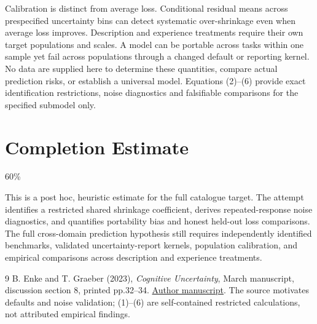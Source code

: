 \documentclass[11pt,a4paper]{article}
\begin{document}
Calibration is distinct from average loss. Conditional residual means across prespecified uncertainty bins can detect systematic over-shrinkage even when average loss improves. Description and experience treatments require their own target populations and scales. A model can be portable across tasks within one sample yet fail across populations through a changed default or reporting kernel. No data are supplied here to determine these quantities, compare actual prediction risks, or establish a universal model. Equations (2)--(6) provide exact identification restrictions, noise diagnostics and falsifiable comparisons for the specified submodel only.

\section{Completion Estimate}
60\%

This is a post hoc, heuristic estimate for the full catalogue target.
The attempt identifies a restricted shared shrinkage coefficient, derives repeated-response noise diagnostics, and quantifies portability bias and honest held-out loss comparisons. The full cross-domain prediction hypothesis still requires independently identified benchmarks, validated uncertainty-report kernels, population calibration, and empirical comparisons across description and experience treatments.

\begin{thebibliography}{9}
 B. Enke and T. Graeber (2023), \emph{Cognitive Uncertainty}, March manuscript, discussion section 8, printed pp.32--34. \href{https://thomasgraeber.com/assets/papers/EnkeGraeber_CognitiveUncertainty.pdf}{Author manuscript}. The source motivates defaults and noise validation; (1)--(6) are self-contained restricted calculations, not attributed empirical findings.
\end{thebibliography}
\end{document}
